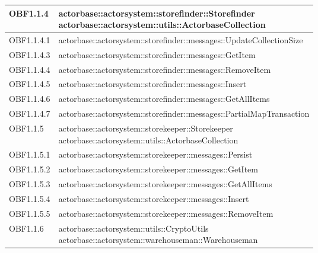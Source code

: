 \documentclass{scalatekids-article}
\begin{document}
\begin{longtable}[H]{|p{5cm}|p{12cm}|}
\hline
OBF1.1.4 & \multiLineCell[t]{actorbase::actorsystem::storefinder::Storefinder\\actorbase::actorsystem::utils::ActorbaseCollection\\}\\
\hline
OBF1.1.4.1 & \multiLineCell[t]{actorbase::actorsystem::storefinder::messages::UpdateCollectionSize\\}\\
\hline
OBF1.1.4.3 & \multiLineCell[t]{actorbase::actorsystem::storefinder::messages::GetItem\\}\\
\hline
OBF1.1.4.4 & \multiLineCell[t]{actorbase::actorsystem::storefinder::messages::RemoveItem\\}\\
\hline
OBF1.1.4.5 & \multiLineCell[t]{actorbase::actorsystem::storefinder::messages::Insert\\}\\
\hline
OBF1.1.4.6 & \multiLineCell[t]{actorbase::actorsystem::storefinder::messages::GetAllItems\\}\\
\hline
OBF1.1.4.7 & \multiLineCell[t]{actorbase::actorsystem::storefinder::messages::PartialMapTransaction\\}\\
\hline
OBF1.1.5 & \multiLineCell[t]{actorbase::actorsystem::storekeeper::Storekeeper\\actorbase::actorsystem::utils::ActorbaseCollection\\}\\
\hline
OBF1.1.5.1 & \multiLineCell[t]{actorbase::actorsystem::storekeeper::messages::Persist\\}\\
\hline
OBF1.1.5.2 & \multiLineCell[t]{actorbase::actorsystem::storekeeper::messages::GetItem\\}\\
\hline
OBF1.1.5.3 & \multiLineCell[t]{actorbase::actorsystem::storekeeper::messages::GetAllItems\\}\\
\hline
OBF1.1.5.4 & \multiLineCell[t]{actorbase::actorsystem::storekeeper::messages::Insert\\}\\
\hline
OBF1.1.5.5 & \multiLineCell[t]{actorbase::actorsystem::storekeeper::messages::RemoveItem\\}\\
\hline
OBF1.1.6 & \multiLineCell[t]{actorbase::actorsystem::utils::CryptoUtils\\actorbase::actorsystem::warehouseman::Warehouseman\\}\\

\end{longtable}
\end{document}
